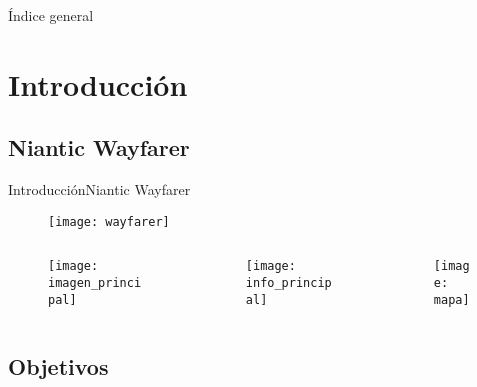 \documentclass[aspectratio = 169]{beamer}
\begin{document}
	
	\begin{frame}[plain]
		\maketitle
	\end{frame}
	
	\begin{frame}{Índice general}
		\tableofcontents[hideallsubsections]
	\end{frame}
	
	\section{Introducción}
	
		\subsection{Niantic Wayfarer}
	
			\begin{frame}{Introducción}{Niantic Wayfarer}
				\begin{figure}
					\centering
					\texttt{[image: wayfarer]}
				\end{figure}
				\vspace{-.4cm}
				\begin{columns}
					\begin{column}{.3\textwidth}
						\begin{figure}
							\centering
							\texttt{[image: imagen\_principal]}
						\end{figure}
					\end{column}
					\begin{column}{.3\textwidth}
						\begin{figure}
							\centering
							\texttt{[image: info\_principal]}
						\end{figure}
					\end{column}
					\begin{column}{.3\textwidth}
						\begin{figure}
							\centering
							\texttt{[image: mapa]}
						\end{figure}
					\end{column}
				\end{columns}
			\end{frame}
			
		\subsection{Objetivos}
		
\end{document}
